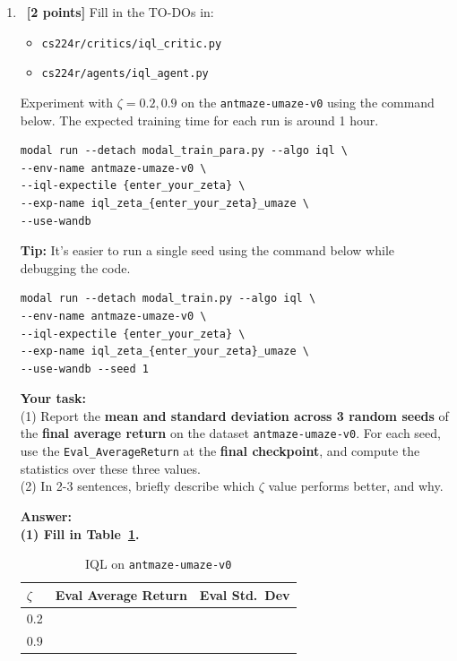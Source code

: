 \documentclass[12pt]{article}
\newcommand{\answer}[1]{{\bf \color{red}Answer:\\ #1}}
\begin{document}
\begin{enumerate}
\item~\textbf{[2 points]} Fill in the TO-DOs in:
\begin{itemize}
    \item \texttt{cs224r/critics/iql\_critic.py}
    \item \texttt{cs224r/agents/iql\_agent.py}
\end{itemize}

Experiment with $\zeta = 0.2, 0.9$ on the \texttt{antmaze-umaze-v0} using the command below. The expected training time for each run is around 1 hour. 

\begin{tcolorbox}[width=\linewidth, sharp corners=all, colback=white!95!black]
\begin{verbatim}
modal run --detach modal_train_para.py --algo iql \
--env-name antmaze-umaze-v0 \
--iql-expectile {enter_your_zeta} \
--exp-name iql_zeta_{enter_your_zeta}_umaze \
--use-wandb
\end{verbatim}
\end{tcolorbox}

\textbf{Tip:} It’s easier to run a single seed using the command below while debugging the code.  

\begin{tcolorbox}[width=\linewidth, sharp corners=all, colback=white!95!black]
\begin{verbatim}
modal run --detach modal_train.py --algo iql \
--env-name antmaze-umaze-v0 \
--iql-expectile {enter_your_zeta} \
--exp-name iql_zeta_{enter_your_zeta}_umaze \
--use-wandb --seed 1
\end{verbatim}
\end{tcolorbox}

\textbf{Your task:} \\
(1) Report the \textbf{mean and standard deviation across 3 random seeds} of the \textbf{final average return} on the dataset \texttt{antmaze-umaze-v0}. For each seed, use the \texttt{Eval\_AverageReturn} at the \textbf{final checkpoint}, and compute the statistics over these three values.\\
(2) In 2-3 sentences, briefly describe which $\zeta$ value performs better, and why.


\noindent

\answer{
(1) Fill in Table~\ref{table:iql_umaze}.
 
\begin{table}[H]
  \centering
  \caption{IQL on \texttt{antmaze-umaze-v0}}
  \label{table:iql_umaze}
  \begin{tabular}{|l|c|c|}
    \toprule
    $\zeta$ & Eval Average Return & Eval Std.\ Dev \\
    \midrule
    0.2 &   &  \\
    0.9 &   &  \\
    \bottomrule
  \end{tabular}
\end{table}
 
}
\end{enumerate}
\end{document}
